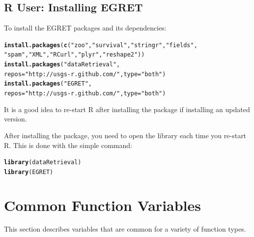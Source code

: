 \documentclass[a4paper,11pt]{article}\usepackage[]{graphicx}\usepackage[]{color}
\makeatletter
\newcommand{\hlstr}[1]{\textcolor[rgb]{0.192,0.494,0.8}{#1}}%
\newcommand{\hlstd}[1]{\textcolor[rgb]{0.345,0.345,0.345}{#1}}%
\newcommand{\hlkwc}[1]{\textcolor[rgb]{0.333,0.667,0.333}{#1}}%
\newcommand{\hlkwd}[1]{\textcolor[rgb]{0.737,0.353,0.396}{\textbf{#1}}}%
\newenvironment{kframe}{%
 \def\at@end@of@kframe{}%
 \ifinner\ifhmode%
  \def\at@end@of@kframe{\end{minipage}}%
  \begin{minipage}{\columnwidth}%
 \fi\fi%
 \def\FrameCommand##1{\hskip\@totalleftmargin \hskip-\fboxsep
 \colorbox{shadecolor}{##1}\hskip-\fboxsep
     \hskip-\linewidth \hskip-\@totalleftmargin \hskip\columnwidth}%
 \MakeFramed {\advance\hsize-\width
   \@totalleftmargin\z@ \linewidth\hsize
   \@setminipage}}%
 {\par\unskip\endMakeFramed%
 \at@end@of@kframe}
\newenvironment{knitrout}{}{} %
\makeatother
\begin{document}
\subsection{R User: Installing EGRET}
To install the EGRET packages and its dependencies:

\begin{knitrout}
\color{fgcolor}\begin{kframe}
\begin{alltt}
\hlkwd{install.packages}\hlstd{(}\hlkwd{c}\hlstd{(}\hlstr{"zoo"}\hlstd{,}\hlstr{"survival"}\hlstd{,}\hlstr{"stringr"}\hlstd{,}\hlstr{"fields"}\hlstd{,}
                   \hlstr{"spam"}\hlstd{,}\hlstr{"XML"}\hlstd{,}\hlstr{"RCurl"}\hlstd{,}\hlstr{"plyr"}\hlstd{,}\hlstr{"reshape2"}\hlstd{))}
\hlkwd{install.packages}\hlstd{(}\hlstr{"dataRetrieval"}\hlstd{,}
                 \hlkwc{repos}\hlstd{=}\hlstr{"http://usgs-r.github.com/"}\hlstd{,}\hlkwc{type}\hlstd{=}\hlstr{"both"}\hlstd{)}
\hlkwd{install.packages}\hlstd{(}\hlstr{"EGRET"}\hlstd{,}
                 \hlkwc{repos}\hlstd{=}\hlstr{"http://usgs-r.github.com/"}\hlstd{,}\hlkwc{type}\hlstd{=}\hlstr{"both"}\hlstd{)}
\end{alltt}
\end{kframe}
\end{knitrout}

It is a good idea to re-start R after installing the package if installing an updated version. 

After installing the package, you need to open the library each time you re-start R.  This is done with the simple command:
\begin{knitrout}
\color{fgcolor}\begin{kframe}
\begin{alltt}
\hlkwd{library}\hlstd{(dataRetrieval)}
\hlkwd{library}\hlstd{(EGRET)}
\end{alltt}
\end{kframe}
\end{knitrout}

\newpage
\FloatBarrier
\section{Common Function Variables}
\label{sec:appendixPlot}
This section describes variables that are common for a variety of function types. 
\end{document}
